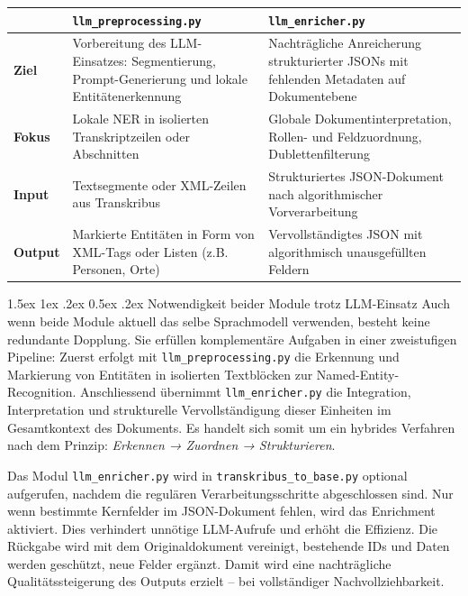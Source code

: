 \documentclass[12pt, a4paper, ngerman, bidi=default]{article}
\makeatletter
\newcommand{\code}[1]{\colorbox{VeryLightGray}{\texttt{#1}}} %
\let\oldparagraph\paragraph%
\renewcommand{\paragraph}{
    \@ifstar%
      \xxxParagraphStar%
      \xxxParagraphNoStar%
 }
\newcommand{\xxxParagraphStar}[1]{\oldparagraph*{#1}\mbox{}}
\newcommand{\xxxParagraphNoStar}[1]{\oldparagraph{#1}\mbox{}}
\renewcommand\paragraph{\@startsection{paragraph}{4}{0em}%
  {1.5ex \@plus1ex \@minus.2ex}%
  {0.5ex \@plus.2ex}%
  {\normalfont\normalsize\bfseries\itshape}}
\makeatother
\begin{document}
\begin{center}
\begin{tabular}{p{1.5cm} p{6.2cm} p{6.2cm}}

\toprule
~ & \textbf{\code{llm\_preprocessing.py}} & \textbf{\code{llm\_enricher.py}} \\
\midrule
\textbf{Ziel} & 
Vorbereitung des LLM-Einsatzes: Segmentierung, Prompt-Generierung und lokale Entitätenerkennung &
Nachträgliche Anreicherung strukturierter JSONs mit fehlenden Metadaten auf Dokumentebene \\
\midrule
\textbf{Fokus} & 
Lokale NER in isolierten Transkriptzeilen oder Abschnitten &
Globale Dokumentinterpretation, Rollen- und Feldzuordnung, Dublettenfilterung \\
\midrule
\textbf{Input} & 
Textsegmente oder XML-Zeilen aus Transkribus &
Strukturiertes JSON-Dokument nach algorithmischer Vorverarbeitung \\
\midrule
\textbf{Output} & 
Markierte Entitäten in Form von XML-Tags oder Listen (z.B. Personen, Orte) &
Vervollständigtes JSON mit algorithmisch unausgefüllten Feldern\\
\bottomrule
\end{tabular}
\end{center}

\paragraph{Notwendigkeit beider Module trotz LLM-Einsatz}%
Auch wenn beide Module aktuell das selbe Sprachmodell verwenden, besteht keine redundante Dopplung. Sie erfüllen komplementäre Aufgaben in einer zweistufigen Pipeline: Zuerst erfolgt mit \code{llm\_preprocessing.py} die Erkennung und Markierung von Entitäten in isolierten Textblöcken zur Named-Entity-Recognition. Anschliessend übernimmt \code{llm\_enricher.py} die Integration, Interpretation und strukturelle Vervollständigung dieser Einheiten im Gesamtkontext des Dokuments. Es handelt sich somit um ein hybrides Verfahren nach dem Prinzip: \textit{Erkennen → Zuordnen → Strukturieren}.

Das Modul \code{llm\_enricher.py} wird in \code{transkribus\_to\_base.py} optional aufgerufen, nachdem die regulären Verarbeitungsschritte abgeschlossen sind. Nur wenn bestimmte Kernfelder im JSON-Dokument fehlen, wird das Enrichment aktiviert. Dies verhindert unnötige LLM-Aufrufe und erhöht die Effizienz. Die Rückgabe wird mit dem Originaldokument vereinigt, bestehende IDs und Daten werden geschützt, neue Felder ergänzt. Damit wird eine nachträgliche Qualitätssteigerung des Outputs erzielt – bei vollständiger Nachvollziehbarkeit.
\end{document}
